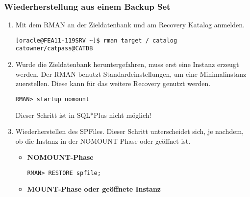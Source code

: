         \subsubsection{Wiederherstellung aus einem Backup Set}
          \begin{enumerate}
            \item Mit dem RMAN an der Zieldatenbank und am Recovery Katalog anmelden.
              \begin{lstlisting}[caption={An der Zieldatenbank und am Recovery Katalog anmelden},label=admin1410,language=rman]
[oracle@FEA11-119SRV ~]$ rman target / catalog catowner/catpass@CATDB
              \end{lstlisting}
            \item Wurde die Zieldatenbank heruntergefahren, muss erst eine Instanz erzeugt werden. Der RMAN benutzt Standardeinstellungen, um eine Minimalinstanz zuerstellen. Diese kann für das weitere Recovery genutzt werden.
              \begin{lstlisting}[caption={Zieldatenbank im RMAN in den NOMOUNT-Status bringen},label=admin1411,language=rman,alsolanguage=sqlplus]
RMAN> startup nomount
              \end{lstlisting}
              \begin{merke}
                Dieser Schritt ist in SQL*Plus nicht möglich!
              \end{merke}
            \item Wiederherstellen des SPFiles. Dieser Schritt unterscheidet sich, je nachdem, ob die Instanz in der NOMOUNT-Phase oder geöffnet ist.
              \begin{itemize}
                \item \textbf{NOMOUNT-Phase}
                  \begin{lstlisting}[caption={Wiederherstellen des SPFiles in der NOMOUNT-Phase},label=admin1412,language=rman]
RMAN> RESTORE spfile;
                  \end{lstlisting}
                \item \textbf{MOUNT-Phase oder geöffnete Instanz}


\end{itemize}
\end{enumerate}
